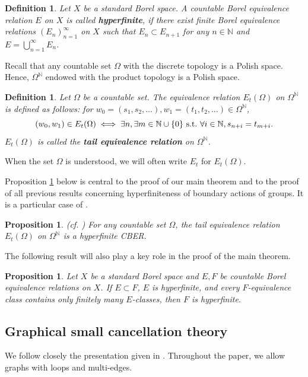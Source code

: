 \documentclass{article}[11pt]
\newtheorem{defn}[thm]{Definition}
\newtheorem{prop}[thm]{Proposition}
\newcommand{\N}{\mathbb{N}}
\begin{document}
{\begin{defn}
    Let $X$ be a standard Borel space. A countable Borel equivalence relation $E$ on $X$ is called \textbf{hyperfinite}, if there exist finite Borel equivalence relations $(E_n)_{n=1}^\infty$ on $X$ such that $E_n\subset E_{n+1}$ for any $n\in\N$ and $E=\bigcup_{n=1}^\infty E_n$.
\end{defn}

Recall that any countable set $\Omega$ with the discrete topology is a Polish space. Hence, $\Omega^\N$ endowed with the product topology is a Polish space. 

\begin{defn}\label{def:tail equivalence}
        Let $\Omega$ be a countable set. The equivalence relation $E_t(\Omega)$ on $\Omega^\N$ is defined as follows: for $w_0=(s_1,s_2,\ldots), w_1=(t_1,t_2,\ldots) \in \Omega^\N$,
    \[
    (w_0,w_1)\in E_t(\Omega) \iff \exists n, \exists m \in\N\cup\{0\} {\rm ~s.t.~}\forall i\in\N, s_{n+i}=t_{m+i}.
    \]
    $E_t(\Omega)$ is called the \textbf{tail equivalence relation} on $\Omega^\N$.
\end{defn}

When the set $\Omega$ is understood, we will often write $E_t$ for $E_t(\Omega)$. 

Proposition \ref{prop:DJK} below is central to the proof of our main theorem and to the proof of all previous results concerning hyperfiniteness of boundary actions of groups. 
It is a particular case of \cite[Corollary 8.2]{DJK94}.

\begin{prop}\label{prop:DJK}{\rm (cf. \cite[Corollary 8.2]{DJK94})}
For any countable set $\Omega$, the tail equivalence relation $E_t(\Omega)$ on $\Omega^\N$ is a hyperfinite CBER.
\end{prop}

The following result will also play a key role in the proof of the main theorem.

\begin{prop}\label{prop:JKL}{\rm \cite[Proposition 1.3.(vii)]{JKL02}}
    Let $X$ be a standard Borel space and $E,F$ be countable Borel equivalence relations on $X$. If $E\subset F$, $E$ is hyperfinite, and every $F$-equivalence class contains only finitely many $E$-classes, then $F$ is hyperfinite.
\end{prop}

\subsection{Graphical small cancellation theory}
\label{section: graphical small cancellation}
We follow closely the presentation given in \cite{Small_Cancellation_Burnside}. Throughout the paper, we allow graphs with loops and multi-edges.

}
\end{document}
